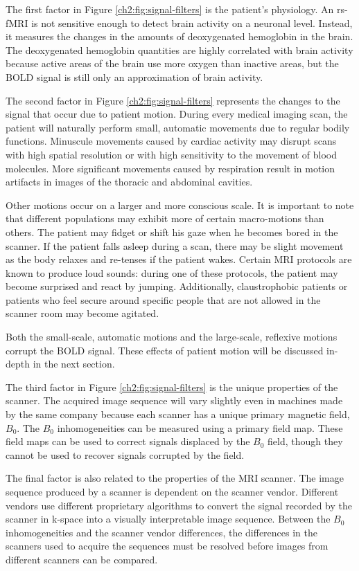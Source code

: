 The first factor in Figure \ref{ch2:fig:signal-filters} is the patient's physiology. An rs-fMRI is not sensitive enough to detect brain activity on a neuronal level. Instead, it measures the changes in the amounts of deoxygenated hemoglobin in the brain. The deoxygenated hemoglobin quantities are highly correlated with brain activity because active areas of the brain use more oxygen than inactive areas, but the BOLD signal is still only an approximation of brain activity.

The second factor in Figure \ref{ch2:fig:signal-filters} represents the changes to the signal that occur due to patient motion.
During every medical imaging scan, the patient will naturally perform small, automatic movements due to regular bodily functions. Minuscule movements caused by cardiac activity may disrupt scans with high spatial resolution or with high sensitivity to the movement of blood molecules. More significant movements caused by respiration result in motion artifacts in images of the thoracic and abdominal cavities. 

Other motions occur on a larger and more conscious scale. It is important to note that different populations may exhibit more of certain macro-motions than others. The patient may fidget or shift his gaze when he becomes bored in the scanner. If the patient falls asleep during a scan, there may be slight movement as the body relaxes and re-tenses if the patient wakes. Certain MRI protocols are known to produce loud sounds: during one of these protocols, the patient may become surprised and react by jumping. Additionally, claustrophobic patients or patients who feel secure around specific people that are not allowed in the scanner room may become agitated. 

Both the small-scale, automatic motions and the large-scale, reflexive motions corrupt the BOLD signal. These effects of patient motion will be discussed in-depth in the next section.

The third factor in Figure \ref{ch2:fig:signal-filters} is the unique properties of the scanner. The acquired image sequence will vary slightly even in machines made by the same company because each scanner has a unique primary magnetic field, $B_0$. The $B_0$ inhomogeneities can be measured using a primary field map. These field maps can be used to correct signals displaced by the $B_0$ field, though they cannot be used to recover signals corrupted by the field.

The final factor is also related to the properties of the MRI scanner. The image sequence produced by a scanner is dependent on the scanner vendor. Different vendors use different proprietary algorithms to convert the signal recorded by the scanner in k-space into a visually interpretable image sequence. Between the $B_0$ inhomogeneities and the scanner vendor differences, the differences in the scanners used to acquire the sequences must be resolved before images from different scanners can be compared.

